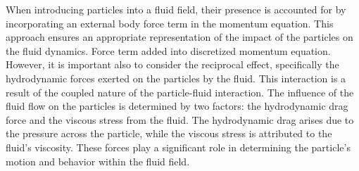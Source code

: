 When introducing particles into a fluid field, their presence is accounted for by incorporating an external body force term in the momentum equation. This approach ensures an appropriate representation of the impact of the particles on the fluid dynamics. Force term added into discretized momentum equation. However, it is important also to consider the reciprocal effect, specifically the hydrodynamic forces exerted on the particles by the fluid. This interaction is a result of the coupled nature of the particle-fluid interaction. The influence of the fluid flow on the particles is determined by two factors: the hydrodynamic drag force and the viscous stress from the fluid. The hydrodynamic drag arises due to the pressure across the particle, while the viscous stress is attributed to the fluid's viscosity. These forces play a significant role in determining the particle's motion and behavior within the fluid field.

